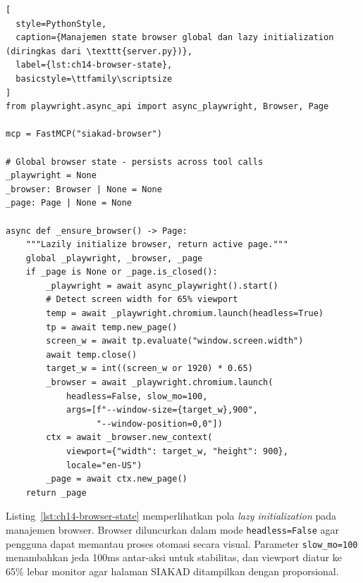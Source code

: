 \begin{lstlisting}[
  style=PythonStyle,
  caption={Manajemen state browser global dan lazy initialization (diringkas dari \texttt{server.py})},
  label={lst:ch14-browser-state},
  basicstyle=\ttfamily\scriptsize
]
from playwright.async_api import async_playwright, Browser, Page

mcp = FastMCP("siakad-browser")

# Global browser state - persists across tool calls
_playwright = None
_browser: Browser | None = None
_page: Page | None = None

async def _ensure_browser() -> Page:
    """Lazily initialize browser, return active page."""
    global _playwright, _browser, _page
    if _page is None or _page.is_closed():
        _playwright = await async_playwright().start()
        # Detect screen width for 65% viewport
        temp = await _playwright.chromium.launch(headless=True)
        tp = await temp.new_page()
        screen_w = await tp.evaluate("window.screen.width")
        await temp.close()
        target_w = int((screen_w or 1920) * 0.65)
        _browser = await _playwright.chromium.launch(
            headless=False, slow_mo=100,
            args=[f"--window-size={target_w},900",
                  "--window-position=0,0"])
        ctx = await _browser.new_context(
            viewport={"width": target_w, "height": 900},
            locale="en-US")
        _page = await ctx.new_page()
    return _page
\end{lstlisting}

\noindent Listing~\ref{lst:ch14-browser-state} memperlihatkan pola \textit{lazy initialization} pada manajemen browser. Browser diluncurkan dalam mode \texttt{headless=False} agar pengguna dapat memantau proses otomasi secara visual. Parameter \texttt{slow\_mo=100} menambahkan jeda 100ms antar-aksi untuk stabilitas, dan viewport diatur ke 65\% lebar monitor agar halaman SIAKAD ditampilkan dengan proporsional.

